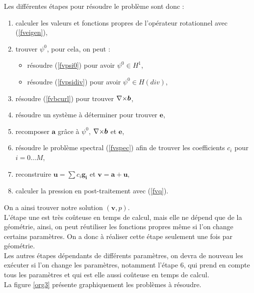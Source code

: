 Les différentes étapes pour résoudre le problème sont donc :
\begin{enumerate}
\item calculer les valeurs et fonctions propres de l'opérateur rotationnel avec (\ref{fveigen}),
\item trouver $\psi^0$, pour cela, on peut :
\begin{itemize}
\item résoudre (\ref{fvpsi0}) pour avoir $\psi^0\in H^1$,
\item résoudre (\ref{fvpsidiv}) pour avoir $\psi^0\in H(div)$,
\end{itemize}
\item résoudre (\ref{fvbcurl}) pour trouver ${\nabla\times}\bm{b}$,
\item résoudre un système à déterminer pour trouver $\bm{e}$,
\item recomposer $\bm{a}$ grâce à $\psi^0$, ${\nabla\times}\bm{b}$ et $\bm{e}$,
\item résoudre le problème spectral (\ref{fvspec}) afin de trouver les coefficients $c_i$ pour $i=0\dots M$,
\item reconstruire $\bm{u}=\sum c_i \bm{g_i}$ et $\bm{v}=\bm{a}+\bm{u}$,
\item calculer la pression en post-traitement avec (\ref{fvq}).
\end{enumerate}

On a ainsi trouver notre solution $(\mathbf{v},p)$.\\
L'étape une est très coûteuse en temps de calcul, mais elle ne dépend que de la géométrie, ainsi, on peut réutiliser les fonctions propres même si l'on change certains paramètres. On a donc à réaliser cette étape seulement une fois par géométrie.\\
Les autres étapes dépendants de différents paramètres, on devra de nouveau les exécuter si l'on change les paramètres, notamment l'étape 6, qui prend en compte tous les paramètres et qui est elle aussi coûteuse en temps de calcul.\\

La figure \ref{org3} présente graphiquement les problèmes à résoudre.\\

